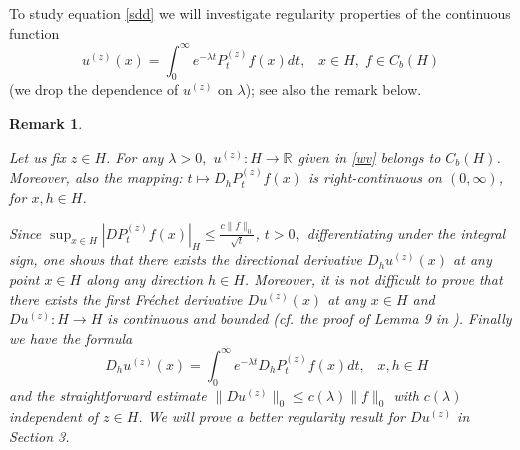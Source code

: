 \documentclass[preprint]{imsart}
\newtheorem{remark}[theorem]{Remark}
\def\R{\mathbb R}
\begin{document}
 \smallskip 
  To study equation \eqref{sdd} we will investigate regularity properties of the continuous function
 \begin{equation}\label{wv}
u^{(z)}(x)=
 \int_0^{\infty} e^{-\lambda t }   P_t^{(z)} f(x)dt, \; \;\; x \in H,\; f \in C_b(H) 
\end{equation}
 (we drop the dependence of $u^{(z)}$ on $\lambda $); see  also the remark below. 
  \begin{remark} \label{ss} 
  {\em  Let us fix $z \in H$.   
 For any $\lambda>0,$ $u^{(z)}: H \to \R$  given in \eqref{wv}   belongs to $C_b(H)$.    
Moreover, also 
the mapping: $t \mapsto D_h P_t^{(z)} f(x)$ is right-continuous  on $(0, \infty)$, for $x,h \in H 
$.
  

Since  $\sup_{x \in H}|D P_t^{(z)} f(x)|_H \le \frac{c \| f\|_0}{\sqrt{t} }$, $t>0,$ differentiating under the integral sign, one  shows that there exists 
the directional derivative $D_h u^{(z)}(x)$ at any point $x \in H$ along any direction $h \in H$. 
    Moreover, it is not difficult to prove that  there exists  
the  first {   Fr\'echet}  derivative  $Du^{(z)}(x)$ at any $x \in H$  and  $Du^{(z)} : H \to H$ is continuous and bounded (cf. the proof of Lemma 9 in \cite{DFPR}).  Finally we have the formula
 \begin{equation}\label{uu1}  
\;\; \; D_h u^{(z)}(x) =   
 \int_0^{\infty} e^{-\lambda t } D_h P_t^{(z)} f(x)dt,\;\;\; x,h \in H
\end{equation} 
and the straightforward estimate $\| Du^{(z)} \|_0 \le c(\lambda) \| f\|_0$ with $c(\lambda)$  independent of $z \in H$. We will prove a  better  regularity result for $Du^{(z)}$ in Section 3. 
} 
\end{remark}   
 
\end{document}
